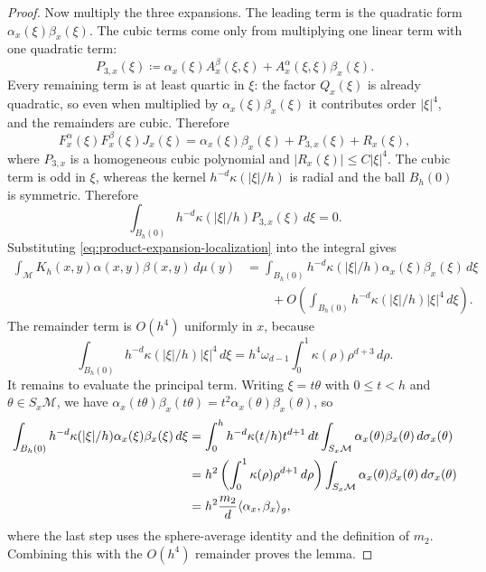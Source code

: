 \documentclass[a4paper,11pt, DIV=10]{scrartcl}
\numberwithin{equation}{section}
\theoremstyle{definition}
\theoremstyle{remark}
\newcommand{\mc}[1]{\mathcal{#1}}
\begin{document}
\begin{proof}
Now multiply the three expansions. The leading term is the quadratic form $\alpha_x(\xi)\beta_x(\xi)$. The cubic terms come only from multiplying one linear term with one quadratic term:
\begin{equation}
P_{3,x}(\xi)\coloneq \alpha_x(\xi)A_x^\beta(\xi,\xi)+A_x^\alpha(\xi,\xi)\beta_x(\xi).
\end{equation}
Every remaining term is at least quartic in $\xi$: the factor $Q_x(\xi)$ is already quadratic, so even when multiplied by $\alpha_x(\xi)\beta_x(\xi)$ it contributes order $|\xi|^4$, and the remainders are cubic. Therefore
\begin{equation}
\label{eq:product-expansion-localization}
F_x^\alpha(\xi)F_x^\beta(\xi)J_x(\xi)
=
\alpha_x(\xi)\beta_x(\xi)+P_{3,x}(\xi)+R_x(\xi),
\end{equation}
where $P_{3,x}$ is a homogeneous cubic polynomial and $|R_x(\xi)|\le C|\xi|^4$.
The cubic term is odd in $\xi$, whereas the kernel $h^{-d}\kappa(|\xi|/h)$ is radial and the ball $B_h(0)$ is symmetric. Therefore
\begin{equation}
\int_{B_h(0)} h^{-d}\kappa(|\xi|/h)P_{3,x}(\xi)\,d\xi=0.
\end{equation}
Substituting \eqref{eq:product-expansion-localization} into the integral gives
\begin{align}
\int_{\mc{M}} K_h(x,y)\alpha(x,y)\beta(x,y)\,d\mu(y)
&=
\int_{B_h(0)} h^{-d}\kappa(|\xi|/h)\alpha_x(\xi)\beta_x(\xi)\,d\xi \\
&\qquad + O\!\left(\int_{B_h(0)} h^{-d}\kappa(|\xi|/h)|\xi|^4\,d\xi\right).
\end{align}
The remainder term is $O(h^4)$ uniformly in $x$, because
\begin{equation}
\int_{B_h(0)} h^{-d}\kappa(|\xi|/h)|\xi|^4\,d\xi
=
h^4\omega_{d-1}\int_0^1 \kappa(\rho)\rho^{d+3}\,d\rho.
\end{equation}
It remains to evaluate the principal term. Writing $\xi=t\theta$ with $0\le t<h$ and $\theta\in S_x\mc{M}$, we have $\alpha_x(t\theta)\beta_x(t\theta)=t^2\alpha_x(\theta)\beta_x(\theta)$, so
\begin{align}
\int_{B_h(0)} h^{-d}\kappa(|\xi|/h)\alpha_x(\xi)\beta_x(\xi)\,d\xi
&=
\int_0^h h^{-d}\kappa(t/h)t^{d+1}\,dt
\int_{S_x\mc{M}} \alpha_x(\theta)\beta_x(\theta)\,d\sigma_x(\theta) \notag \\
&=
h^2\left(\int_0^1 \kappa(\rho)\rho^{d+1}\,d\rho\right)
\int_{S_x\mc{M}} \alpha_x(\theta)\beta_x(\theta)\,d\sigma_x(\theta) \notag \\
&=
h^2\frac{m_2}{d}\langle \alpha_x,\beta_x\rangle_g,
\end{align}
where the last step uses the sphere-average identity and the definition of $m_2$. Combining this with the $O(h^4)$ remainder proves the lemma.
\end{proof}
\end{document}
